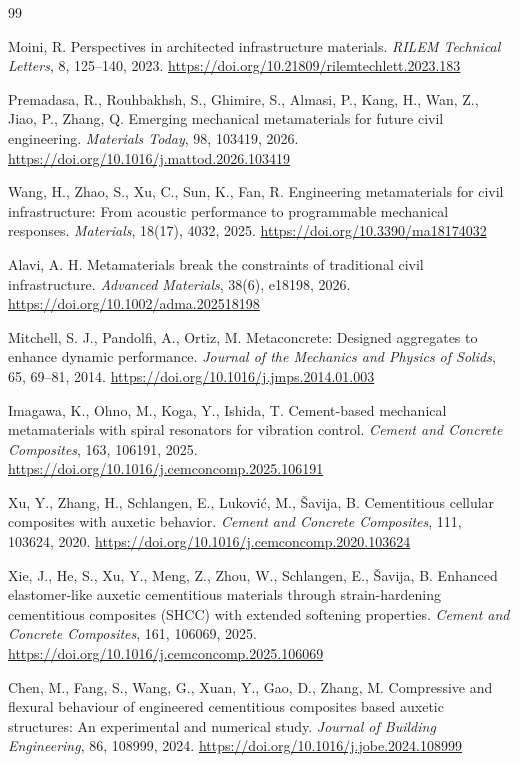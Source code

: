 \documentclass[12pt,a4paper]{article}
\begin{document}
\begin{thebibliography}{99}
	
	Moini, R.
	Perspectives in architected infrastructure materials.
	\textit{RILEM Technical Letters}, 8, 125--140, 2023.
	\url{https://doi.org/10.21809/rilemtechlett.2023.183}
	
	Premadasa, R., Rouhbakhsh, S., Ghimire, S., Almasi, P., Kang, H., Wan, Z., Jiao, P., Zhang, Q.
	Emerging mechanical metamaterials for future civil engineering.
	\textit{Materials Today}, 98, 103419, 2026.
	\url{https://doi.org/10.1016/j.mattod.2026.103419}
	
	Wang, H., Zhao, S., Xu, C., Sun, K., Fan, R.
	Engineering metamaterials for civil infrastructure: From acoustic performance to programmable mechanical responses.
	\textit{Materials}, 18(17), 4032, 2025.
	\url{https://doi.org/10.3390/ma18174032}
	
	Alavi, A. H.
	Metamaterials break the constraints of traditional civil infrastructure.
	\textit{Advanced Materials}, 38(6), e18198, 2026.
	\url{https://doi.org/10.1002/adma.202518198}
	
	Mitchell, S. J., Pandolfi, A., Ortiz, M.
	Metaconcrete: Designed aggregates to enhance dynamic performance.
	\textit{Journal of the Mechanics and Physics of Solids}, 65, 69--81, 2014.
	\url{https://doi.org/10.1016/j.jmps.2014.01.003}
	
	Imagawa, K., Ohno, M., Koga, Y., Ishida, T.
	Cement-based mechanical metamaterials with spiral resonators for vibration control.
	\textit{Cement and Concrete Composites}, 163, 106191, 2025.
	\url{https://doi.org/10.1016/j.cemconcomp.2025.106191}
	
	Xu, Y., Zhang, H., Schlangen, E., Lukovi{\'c}, M., {\v{S}}avija, B.
	Cementitious cellular composites with auxetic behavior.
	\textit{Cement and Concrete Composites}, 111, 103624, 2020.
	\url{https://doi.org/10.1016/j.cemconcomp.2020.103624}
	
	Xie, J., He, S., Xu, Y., Meng, Z., Zhou, W., Schlangen, E., {\v{S}}avija, B.
	Enhanced elastomer-like auxetic cementitious materials through strain-hardening cementitious composites (SHCC) with extended softening properties.
	\textit{Cement and Concrete Composites}, 161, 106069, 2025.
	\url{https://doi.org/10.1016/j.cemconcomp.2025.106069}
	
	Chen, M., Fang, S., Wang, G., Xuan, Y., Gao, D., Zhang, M.
	Compressive and flexural behaviour of engineered cementitious composites based auxetic structures: An experimental and numerical study.
	\textit{Journal of Building Engineering}, 86, 108999, 2024.
	\url{https://doi.org/10.1016/j.jobe.2024.108999}
	

\end{thebibliography}
\end{document}
